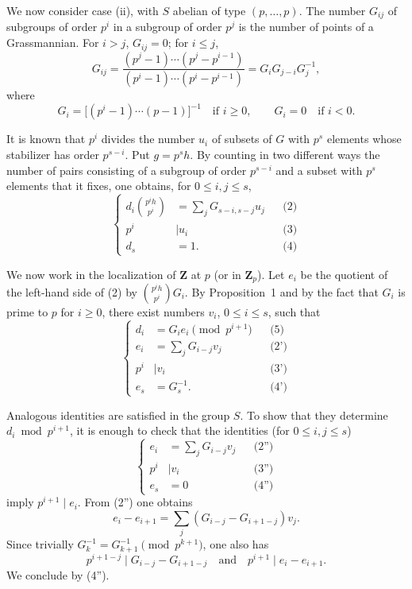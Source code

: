 \documentclass[11pt]{article}
\newcommand{\Z}{\mathbf{Z}}
\begin{document}
We now consider case (ii), with \(S\) abelian of type \((p,\ldots,p)\). The
number \(G_{ij}\) of subgroups of order \(p^i\) in a subgroup of order \(p^j\)
is the number of points of a Grassmannian. For \(i>j\), \(G_{ij}=0\); for
\(i\leq j\),
\[
        G_{ij}
        =\frac{(p^j-1)\cdots(p^j-p^{i-1})}
              {(p^i-1)\cdots(p^i-p^{i-1})}
        =G_iG_{j-i}G_j^{-1},
\]
where
\[
        G_i=\bigl[(p^i-1)\cdots(p-1)\bigr]^{-1}\quad\text{if }i\geq0,
        \qquad
        G_i=0\quad\text{if }i<0.
\]

It is known that \(p^i\) divides the number \(u_i\) of subsets of \(G\) with
\(p^s\) elements whose stabilizer has order \(p^{s-i}\). Put \(g=p^s h\). By
counting in two different ways the number of pairs consisting of a subgroup of
order \(p^{s-i}\) and a subset with \(p^s\) elements that it fixes, one obtains,
for \(0\leq i,j\leq s\),
\[
\left\{
\begin{aligned}
 d_i\binom{p^i h}{p^i}&=\sum_j G_{s-i,s-j}u_j &&\text{(2)}\\
 p^i&\mid u_i &&\text{(3)}\\
 d_s&=1. &&\text{(4)}
\end{aligned}
\right.
\]

We now work in the localization of \(\Z\) at \(p\) (or in \(\Z_p\)). Let \(e_i\)
be the quotient of the left-hand side of (2) by
\(\binom{p^i h}{p^i}G_i\). By Proposition~1 and by the fact that \(G_i\) is
prime to \(p\) for \(i\geq0\), there exist numbers \(v_i\), \(0\leq i\leq s\),
such that
\[
\left\{
\begin{aligned}
 d_i&=G_i e_i \pmod {p^{i+1}} &&\text{(5)}\\
 e_i&=\sum_j G_{i-j}v_j &&\text{(2')}\\
 p^i&\mid v_i &&\text{(3')}\\
 e_s&=G_s^{-1}. &&\text{(4')}
\end{aligned}
\right.
\]

Analogous identities are satisfied in the group \(S\). To show that they
determine \(d_i\bmod p^{i+1}\), it is enough to check that the identities
(for \(0\leq i,j\leq s\))
\[
\left\{
\begin{aligned}
 e_i&=\sum_j G_{i-j}v_j &&\text{(2'')}\\
 p^i&\mid v_i &&\text{(3'')}\\
 e_s&=0 &&\text{(4'')}
\end{aligned}
\right.
\]
imply \(p^{i+1}\mid e_i\). From (2'') one obtains
\[
        e_i-e_{i+1}=\sum_j (G_{i-j}-G_{i+1-j})v_j .
\]
Since trivially \(G_k^{-1}=G_{k+1}^{-1}\pmod {p^{k+1}}\), one also has
\[
        p^{i+1-j}\mid G_{i-j}-G_{i+1-j}
        \quad\text{and}\quad
        p^{i+1}\mid e_i-e_{i+1}.
\]
We conclude by (4'').
\end{document}
